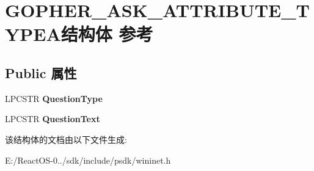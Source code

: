 \hypertarget{struct_g_o_p_h_e_r___a_s_k___a_t_t_r_i_b_u_t_e___t_y_p_e_a}{}\section{G\+O\+P\+H\+E\+R\+\_\+\+A\+S\+K\+\_\+\+A\+T\+T\+R\+I\+B\+U\+T\+E\+\_\+\+T\+Y\+P\+E\+A结构体 参考}
\label{struct_g_o_p_h_e_r___a_s_k___a_t_t_r_i_b_u_t_e___t_y_p_e_a}
\subsection*{Public 属性}
\begin{DoxyCompactItemize}
\item 
\mbox{\label{struct_g_o_p_h_e_r___a_s_k___a_t_t_r_i_b_u_t_e___t_y_p_e_a_a82f745c21aacc29c40d9c3968cbc246a}} 
L\+P\+C\+S\+TR {\bfseries Question\+Type}
\item 
\mbox{\label{struct_g_o_p_h_e_r___a_s_k___a_t_t_r_i_b_u_t_e___t_y_p_e_a_aa516d217eb7e7d6584e0ad0fa1b69450}} 
L\+P\+C\+S\+TR {\bfseries Question\+Text}
\end{DoxyCompactItemize}


该结构体的文档由以下文件生成\+:\begin{DoxyCompactItemize}
\item 
E\+:/\+React\+O\+S-\/0../sdk/include/psdk/wininet.\+h\end{DoxyCompactItemize}

